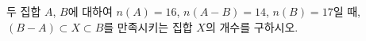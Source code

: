 두 집합 $A$, $B$에 대하여 $n(A)=16$, $n(A-B)=14$, $n(B)=17$일 때, $(B-A)\subset X\subset B$를 만족시키는 집합 $X$의 개수를 구하시오.

